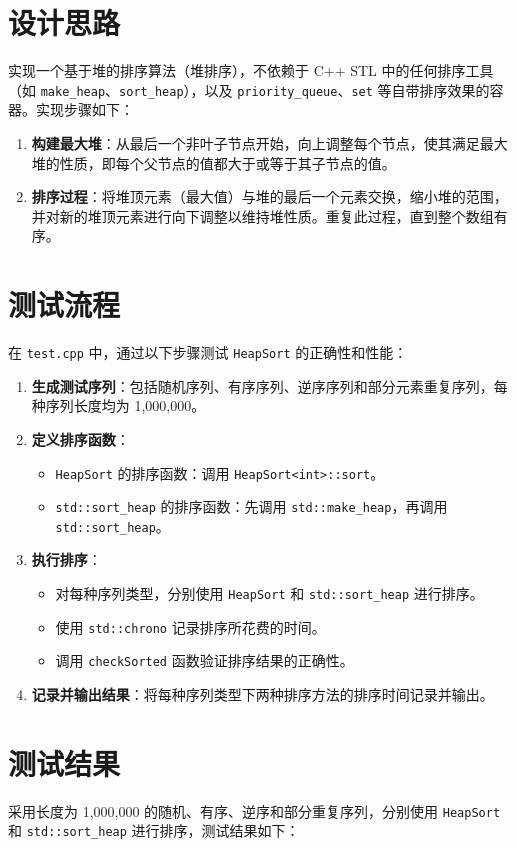 \documentclass[UTF8, 12pt]{ctexart}
\begin{document}
\section{设计思路}
实现一个基于堆的排序算法（堆排序），不依赖于 C++ STL 中的任何排序工具（如 \verb|make_heap|、\verb|sort_heap|），以及 \verb|priority_queue|、\verb|set| 等自带排序效果的容器。实现步骤如下：
\begin{enumerate}
    \item \textbf{构建最大堆}：从最后一个非叶子节点开始，向上调整每个节点，使其满足最大堆的性质，即每个父节点的值都大于或等于其子节点的值。
    \item \textbf{排序过程}：将堆顶元素（最大值）与堆的最后一个元素交换，缩小堆的范围，并对新的堆顶元素进行向下调整以维持堆性质。重复此过程，直到整个数组有序。
\end{enumerate}

\section{测试流程}
在 \verb|test.cpp| 中，通过以下步骤测试 \verb|HeapSort| 的正确性和性能：
\begin{enumerate}
    \item \textbf{生成测试序列}：包括随机序列、有序序列、逆序序列和部分元素重复序列，每种序列长度均为 1,000,000。
    \item \textbf{定义排序函数}：
    \begin{itemize}
        \item \verb|HeapSort| 的排序函数：调用 \verb|HeapSort<int>::sort|。
        \item \verb|std::sort_heap| 的排序函数：先调用 \verb|std::make_heap|，再调用 \verb|std::sort_heap|。
    \end{itemize}
    \item \textbf{执行排序}：
    \begin{itemize}
        \item 对每种序列类型，分别使用 \verb|HeapSort| 和 \verb|std::sort_heap| 进行排序。
        \item 使用 \verb|std::chrono| 记录排序所花费的时间。
        \item 调用 \verb|checkSorted| 函数验证排序结果的正确性。
    \end{itemize}
    \item \textbf{记录并输出结果}：将每种序列类型下两种排序方法的排序时间记录并输出。
\end{enumerate}

\section{测试结果}
采用长度为 1,000,000 的随机、有序、逆序和部分重复序列，分别使用 \verb|HeapSort| 和 \verb|std::sort_heap| 进行排序，测试结果如下：
\end{document}
